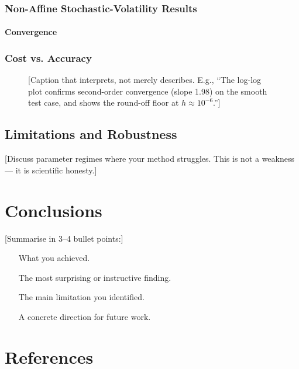 \documentclass[11pt,a4paper]{article}
\theoremstyle{definition}
\theoremstyle{remark}
\begin{document}
\subsubsection{Non-Affine Stochastic-Volatility Results}
\paragraph{Convergence}

\subsubsection{Cost vs. Accuracy}
\begin{figure}[H]
\centering
{}
\caption{[Caption that interprets, not merely describes. E.g., ``The log-log plot
confirms second-order convergence (slope 1.98) on the smooth test case, and shows
the round-off floor at $h \approx 10^{-6}$.'']}
\label{fig:convergence}
\end{figure}

\subsection{Limitations and Robustness}
[Discuss parameter regimes where your method struggles. This is not a weakness ---
it is scientific honesty.]

\newpage
\section{Conclusions}

[Summarise in 3--4 bullet points:]
\begin{itemize}[leftmargin=2em]
\item [What you achieved.]
\item [The most surprising or instructive finding.]
\item [The main limitation you identified.]
\item [A concrete direction for future work.]
\end{itemize}

\newpage
\section*{References}
\end{document}
